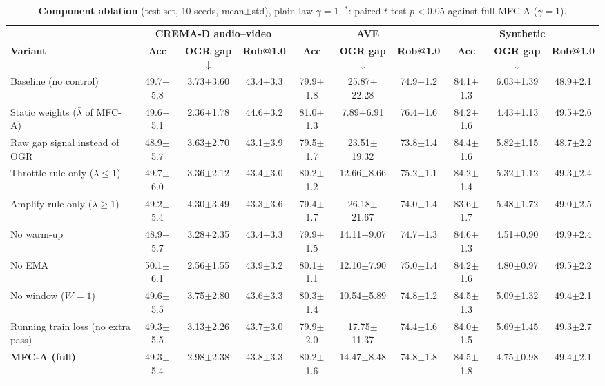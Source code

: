 \documentclass[fleqn,10pt]{wlscirep}
\newcommand{\pmm}{$\pm$}
\begin{document}
\begin{table}[t]
\caption{\textbf{Component ablation} (test set, 10 seeds, mean\pmm std), plain law $\gamma{=}1$. $^{*}$: paired $t$-test $p<0.05$ against full MFC-A ($\gamma{=}1$).}
\label{tab:ablation}
\centering
\footnotesize
\setlength{\tabcolsep}{3pt}
\begin{tabular}{@{}lccc@{\hskip 8pt}ccc@{\hskip 8pt}ccc@{}}
\toprule
& \multicolumn{3}{c}{\textbf{CREMA-D audio--video}} & \multicolumn{3}{c}{\textbf{AVE}} & \multicolumn{3}{c}{\textbf{Synthetic}} \\
\cmidrule(lr){2-4}\cmidrule(lr){5-7}\cmidrule(lr){8-10}
\textbf{Variant} & \textbf{Acc} & \textbf{OGR gap}$\downarrow$ & \textbf{Rob@1.0} & \textbf{Acc} & \textbf{OGR gap}$\downarrow$ & \textbf{Rob@1.0} & \textbf{Acc} & \textbf{OGR gap}$\downarrow$ & \textbf{Rob@1.0} \\ \midrule
Baseline (no control) & 49.7$\pm$5.8 & 3.73$\pm$3.60 & 43.4$\pm$3.3 & 79.9$\pm$1.8 & 25.87$\pm$22.28 & 74.9$\pm$1.2 & 84.1$\pm$1.3 & 6.03$\pm$1.39 & 48.9$\pm$2.1 \\
Static weights ($\bar\lambda$ of MFC-A) & 49.6$\pm$5.1 & 2.36$\pm$1.78 & 44.6$\pm$3.2 & 81.0$\pm$1.3 & 7.89$\pm$6.91 & 76.4$\pm$1.6 & 84.2$\pm$1.6 & 4.43$\pm$1.13 & 49.5$\pm$2.6 \\
Raw gap signal instead of OGR & 48.9$\pm$5.7 & 3.63$\pm$2.70 & 43.1$\pm$3.9 & 79.5$\pm$1.7 & 23.51$\pm$19.32 & 73.8$\pm$1.4 & 84.4$\pm$1.6 & 5.82$\pm$1.15 & 48.7$\pm$2.2 \\
Throttle rule only ($\lambda\le1$) & 49.7$\pm$6.0 & 3.36$\pm$2.12 & 43.4$\pm$3.0 & 80.2$\pm$1.2 & 12.66$\pm$8.66 & 75.2$\pm$1.1 & 84.2$\pm$1.4 & 5.32$\pm$1.12 & 49.3$\pm$2.4 \\
Amplify rule only ($\lambda\ge1$) & 49.2$\pm$5.4 & 4.30$\pm$3.49 & 43.3$\pm$3.6 & 79.4$\pm$1.7 & 26.18$\pm$21.67 & 74.0$\pm$1.4 & 83.6$\pm$1.7 & 5.48$\pm$1.72 & 49.0$\pm$2.5 \\
No warm-up & 48.9$\pm$5.7 & 3.28$\pm$2.35 & 43.4$\pm$3.3 & 79.9$\pm$1.5 & 14.11$\pm$9.07 & 74.7$\pm$1.3 & 84.6$\pm$1.3 & 4.51$\pm$0.90 & 49.9$\pm$2.4 \\
No EMA & 50.1$\pm$6.1 & 2.56$\pm$1.55 & 43.9$\pm$3.2 & 80.1$\pm$1.1 & 12.10$\pm$7.90 & 75.0$\pm$1.4 & 84.2$\pm$1.6 & 4.80$\pm$0.97 & 49.5$\pm$2.2 \\
No window ($W{=}1$) & 49.6$\pm$5.5 & 3.75$\pm$2.80 & 43.6$\pm$3.3 & 80.3$\pm$1.4 & 10.54$\pm$5.89 & 74.8$\pm$1.2 & 84.5$\pm$1.3 & 5.09$\pm$1.32 & 49.4$\pm$2.1 \\
Running train loss (no extra pass) & 49.3$\pm$5.5 & 3.13$\pm$2.26 & 43.7$\pm$3.0 & 79.9$\pm$2.0 & 17.75$\pm$11.37 & 74.4$\pm$1.6 & 84.0$\pm$1.5 & 5.69$\pm$1.45 & 49.3$\pm$2.7 \\
\textbf{MFC-A (full)} & 49.3$\pm$5.4 & 2.98$\pm$2.38 & 43.8$\pm$3.3 & 80.2$\pm$1.6 & 14.47$\pm$8.48 & 74.8$\pm$1.8 & 84.5$\pm$1.8 & 4.75$\pm$0.98 & 49.4$\pm$2.1 \\
\bottomrule
\end{tabular}
\end{table}
\end{document}
